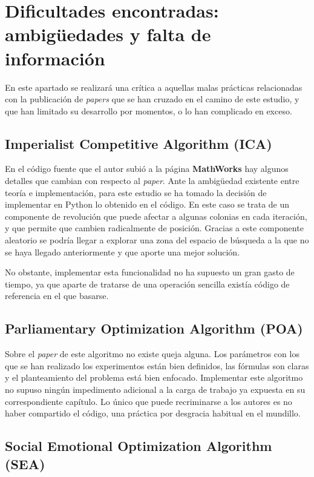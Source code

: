 \section{Dificultades encontradas: ambigüedades y falta de información}

En este apartado se realizará una crítica a aquellas malas prácticas relacionadas con la publicación de \textit{papers} que se han cruzado en el camino de este estudio, y que han limitado su desarrollo por momentos, o lo han complicado en exceso.

\subsection{Imperialist Competitive Algorithm (ICA)}

En el código fuente que el autor subió a la página \textbf{MathWorks} \cite{ica-matlab} hay algunos detalles que cambian con respecto al \textit{paper}. Ante la ambigüedad existente entre teoría e implementación, para este estudio se ha tomado la decisión de implementar en Python lo obtenido en el código. En este caso se trata de un componente de revolución que puede afectar a algunas colonias en cada iteración, y que permite que cambien radicalmente de posición. Gracias a este componente aleatorio se podría llegar a explorar una zona del espacio de búsqueda a la que no se haya llegado anteriormente y que aporte una mejor solución.

No obstante, implementar esta funcionalidad no ha supuesto un gran gasto de tiempo, ya que aparte de tratarse de una operación sencilla existía código de referencia en el que basarse.

\subsection{Parliamentary Optimization Algorithm (POA)}

Sobre el \textit{paper} de este algoritmo no existe queja alguna. Los parámetros con los que se han realizado los experimentos están bien definidos, las fórmulas son claras y el planteamiento del problema está bien enfocado. Implementar este algoritmo no supuso ningún impedimento adicional a la carga de trabajo ya expuesta en su correspondiente capítulo. Lo único que puede recriminarse a los autores es no haber compartido el código, una práctica por desgracia habitual en el mundillo.

\subsection{Social Emotional Optimization Algorithm (SEA)}

